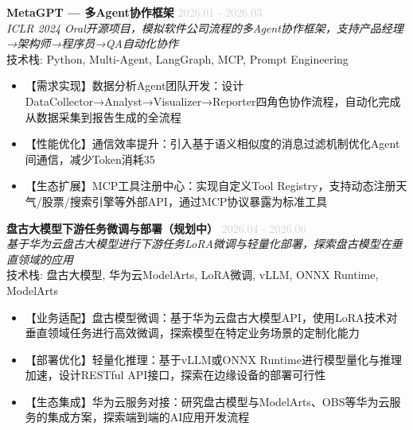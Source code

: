 \documentclass[11pt,a4paper]{article}
\begin{document}
\noindent\textbf{MetaGPT — 多Agent协作框架} \hfill \textcolor{lightgray}{2026.01 - 2026.03}\\
\textit{ICLR 2024 Oral开源项目，模拟软件公司流程的多Agent协作框架，支持产品经理→架构师→程序员→QA自动化协作}\\
技术栈: Python, Multi-Agent, LangGraph, MCP, Prompt Engineering
\begin{itemize}

  \item 【需求实现】数据分析Agent团队开发：设计DataCollector→Analyst→Visualizer→Reporter四角色协作流程，自动化完成从数据采集到报告生成的全流程

  \item 【性能优化】通信效率提升：引入基于语义相似度的消息过滤机制优化Agent间通信，减少Token消耗35%

  \item 【生态扩展】MCP工具注册中心：实现自定义Tool Registry，支持动态注册天气/股票/搜索引擎等外部API，通过MCP协议暴露为标准工具

\end{itemize}


\noindent\textbf{盘古大模型下游任务微调与部署（规划中）} \hfill \textcolor{lightgray}{2026.04 - 2026.06}\\
\textit{基于华为云盘古大模型进行下游任务LoRA微调与轻量化部署，探索盘古模型在垂直领域的应用}\\
技术栈: 盘古大模型, 华为云ModelArts, LoRA微调, vLLM, ONNX Runtime, ModelArts
\begin{itemize}

  \item 【业务适配】盘古模型微调：基于华为云盘古大模型API，使用LoRA技术对垂直领域任务进行高效微调，探索模型在特定业务场景的定制化能力

  \item 【部署优化】轻量化推理：基于vLLM或ONNX Runtime进行模型量化与推理加速，设计RESTful API接口，探索在边缘设备的部署可行性

  \item 【生态集成】华为云服务对接：研究盘古模型与ModelArts、OBS等华为云服务的集成方案，探索端到端的AI应用开发流程

\end{itemize}
\end{document}
